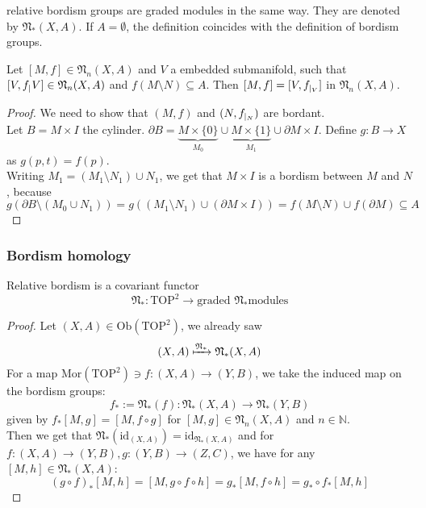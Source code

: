 \documentclass[a4paper,11pt]{article}
\begin{document}
relative bordism groups are graded modules in the same way. They are denoted by \(\mathfrak{N}_\ast(X,A)\).
If \(A=\emptyset\), the definition coincides with the definition of bordism groups.

\begin{lemma}\label{almost excision}\cite[Lemma 5.1]{zhang} %
    Let \([M,f]\in\mathfrak{N}_n(X,A)\) and \(V\) a embedded submanifold, such that \([V,f_{|_{}}{V}]\in\mathfrak{N}_n(X,A)\) and \(f(M\setminus N)\subseteq A\). Then \([M,f]=[V,f_{|_{V}}]\) in \(\mathfrak{N}_n(X,A)\).
\end{lemma}

\begin{proof}\cite{zhang}
    We need to show that \((M,f)\) and \((N,f_{|_{N}})\) are bordant.\\
    Let \(B=M\times I\) the cylinder. \(\partial B= \underbrace{M\times\{0\}}_{M_0}\cup \underbrace{M\times\{1\}}_{M_1}\cup \partial M\times I\). Define \(g:B\to X\) as \(g(p,t)=f(p)\).\\
    Writing \(M_1=(M_1\setminus N_1)\cup N_1\), we get that \(M\times I\) is a bordism between \(M\) and \(N\), because
    \[g(\partial B\setminus(M_0\cup N_1))=g((M_1\setminus N_1)\cup(\partial M\times I))=f(M\setminus N)\cup f(\partial M)\subseteq A\]
\end{proof}

\subsubsection{Bordism homology}

\begin{lemma}\cite[II, Satz 3.2]{brocker}\label{functoriality}
    Relative bordism is a covariant functor \[\mathfrak{N}_\ast:\mathrm{TOP}^2\to\text{graded \(\mathfrak{N}_\ast\)modules}\]
\end{lemma}

\begin{proof}\cite{brocker} 
    Let \((X,A)\in\mathrm{Ob}(\mathrm{TOP}^2)\), we already saw
    \[(X,A)\xmapsto{\mathfrak{N}_\ast}\mathfrak{N}_\ast(X,A)\]
    For a map \(\mathrm{Mor}(\mathrm{TOP}^2)\ni f:(X,A)\to(Y,B)\), we take the induced map on the bordism groups:
    \[f_\ast:=\mathfrak{N}_\ast(f):\mathfrak{N}_\ast(X,A)\to\mathfrak{N}_\ast(Y,B)\]
    given by \(f_\ast[M,g]=[M,f\circ g]\) for \([M,g]\in\mathfrak{N}_n(X,A)\) and \(n\in\mathbb{N}\).\\
    Then we get that \(\mathfrak{N}_\ast(\mathrm{id}_{(X,A)})=\mathrm{id}_{\mathfrak{N}_\ast(X,A)}\) and for \(f:(X,A)\to(Y,B), g:(Y,B)\to(Z,C)\), we have for any \([M,h]\in\mathfrak{N}_\ast(X,A)\):
    \[{(g\circ f)}_{\ast}[M,h]=[M,g\circ f\circ h]=g_\ast[M,f\circ h]=g_\ast\circ f_\ast[M,h]\]
\end{proof}
\end{document}
